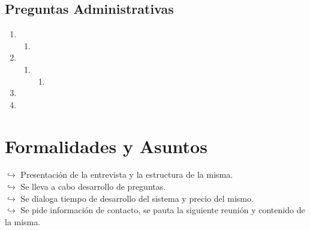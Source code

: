\documentclass[a4paper,10pt]{article}
\begin{document}
\subsection{Preguntas Administrativas}
\begin{enumerate}
    \item 
    \begin{enumerate}
        \item 
    \end{enumerate}
    \item 
    \begin{enumerate}
        \item 
        \begin{enumerate}
            \item 
        \end{enumerate}
    \end{enumerate}
    \item 
    \item 
\end{enumerate}


\section{Formalidades y Asuntos}
$\hookrightarrow{}$ Presentación de la entrevista y la estructura de la misma. \\
$\hookrightarrow{}$ Se lleva a cabo desarrollo de preguntas. \\
$\hookrightarrow{}$ Se dialoga tiempo de desarrollo del sistema y precio del mismo. \\
$\hookrightarrow{}$ Se pide información de contacto, se pauta la siguiente reunión y contenido de la misma. \\
\end{document}
